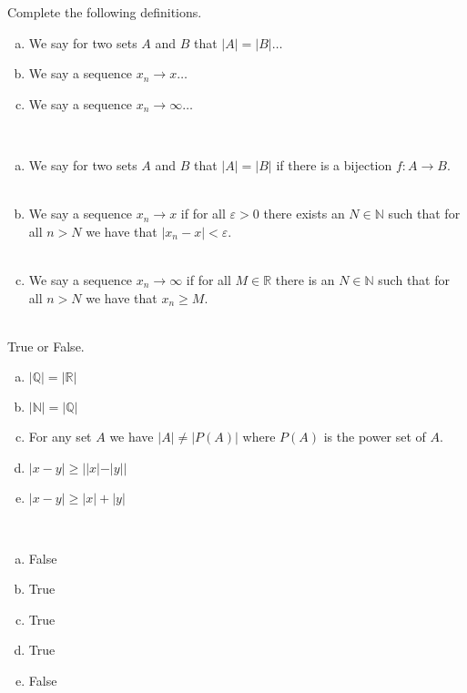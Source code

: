 \documentclass[11pt]{exam}
\theoremstyle{definition}
\begin{document}
\begin{questions}
\question Complete the following definitions. 
\begin{enumerate}[(a)]
\item We say for two sets $A$ and $B$ that $|A|=|B|\ldots $
\item We say a sequence $x_n\rightarrow x\ldots$ 
\item We say a sequence $x_n\rightarrow \infty\ldots $
\end{enumerate}
\ \\
\begin{enumerate}[(a)]
\item We say for two sets $A$ and $B$ that $|A|=|B|$ if there is a bijection $f:A\rightarrow B$. \\
\ \\
\item We say a sequence $x_n\rightarrow x$ if for all $\varepsilon>0$ there exists an $N\in \mathbb{N}$ such that for all $n>N$ we have that $|x_n-x|<\varepsilon$.  \\
\ \\
\item We say a sequence $x_n\rightarrow \infty$ if for all $M\in \mathbb{R}$ there is an $N\in \mathbb{N}$ such that for all $n>N$ we have that $x_n\geq M$. \\
\end{enumerate}
\ \\
\question True or False. 
\begin{enumerate}[(a)]
\item $|\mathbb{Q}|=|\mathbb{R}|$
\item $|\mathbb{N}|=|\mathbb{Q}|$
\item For any set $A$ we have $|A|\neq |P(A)|$ where $P(A)$ is the power set of $A$. 
\item $|x-y|\geq ||x|-|y||$
\item $|x-y|\geq |x|+|y|$
\end{enumerate} 
\ \\
\begin{enumerate}[(a)]
\item False
\item True
\item True
\item True 
\item False
\end{enumerate}


\end{questions}
\end{document}
